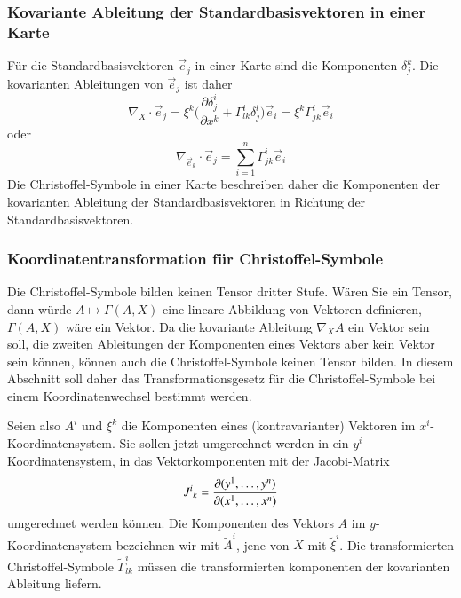 

%
%
\subsubsection{Kovariante Ableitung der Standardbasisvektoren in einer Karte}
Für die Standardbasisvektoren $\vec{e}_j$ in einer Karte sind die
Komponenten $\delta_j^k$.
Die kovarianten Ableitungen von $\vec{e}_j$ ist daher
\begin{equation}
\nabla_X\cdot \vec{e}_j
=
\xi^k
\biggl(
\frac{\partial \delta_j^i}{\partial x^k}
+
\Gamma^i_{lk}
\delta_j^l
\biggr)
\vec{e}_i
=
\xi^k\Gamma^i_{jk}\vec{e}_i
\label{buch:zusammenhang:paralleltransport:kovabl:eqn:kontravektor}
\end{equation}
oder
\begin{equation}
\nabla_{\vec{e}_k}\cdot \vec{e}_j
=
\sum_{i=1}^n
\Gamma^i_{jk}\vec{e}_i
\label{buch:zusammenhang:paralleltransport:kovabl:eqn:kontrabasis}
\end{equation}
Die Christoffel-Symbole in einer Karte beschreiben daher die Komponenten
der kovarianten Ableitung der Standardbasisvektoren in Richtung
der Standardbasisvektoren.

%
%
\subsubsection{Koordinatentransformation für Christoffel-Symbole}
Die Christoffel-Symbole bilden keinen Tensor dritter Stufe.
Wären Sie ein Tensor, dann würde $A\mapsto \Gamma(A,X)$ eine lineare
Abbildung von Vektoren definieren, $\Gamma(A,X)$ wäre ein Vektor.
Da die kovariante Ableitung $\nabla_XA$ ein Vektor sein soll,
die zweiten Ableitungen der Komponenten eines Vektors aber kein Vektor
sein können, können auch die Christoffel-Symbole keinen Tensor bilden.
In diesem Abschnitt soll daher das Transformationsgesetz für die
Christoffel-Symbole bei einem Koordinatenwechsel bestimmt werden.

Seien also $A^i$ und $\xi^k$ die Komponenten eines (kontravarianter)
Vektoren im $x^i$-Koor\-di\-na\-ten\-system.
Sie sollen jetzt umgerechnet werden in ein $y^i$-Koordinatensystem, in
das Vektorkomponenten mit der Jacobi-Matrix
\[
J^i\mathstrut_k
=
\frac{\partial (y^1,\dots,y^n)}{\partial(x^1,\dots,x^n)}
\]
umgerechnet werden können.
Die Komponenten des Vektors $A$ im $y$-Koordinatensystem bezeichnen
wir mit $\tilde{A}^i$, jene von $X$ mit $\tilde{\xi}^i$.
Die transformierten Christoffel-Symbole $\tilde{\Gamma}^i_{lk}$ müssen
die transformierten komponenten der kovarianten Ableitung liefern.

